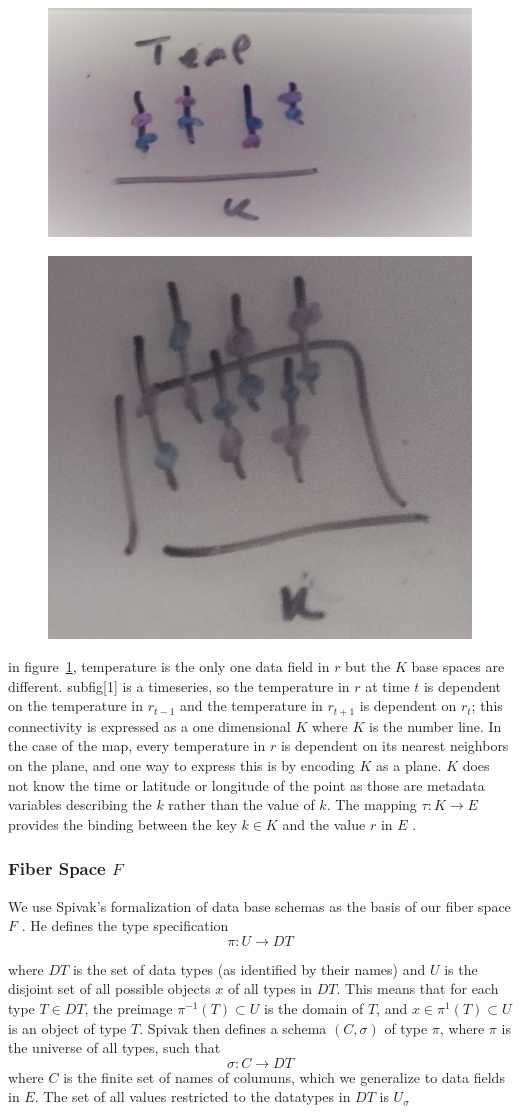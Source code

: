 \documentclass[../main.tex]{subfiles}
\begin{document}
\begin{figure}[ht]
    \includegraphics[width=0.2\linewidth]{figures/sections/math/temp_1k.png}
    \label{fig:k_data}
\end{figure}

\begin{figure}[ht]
    \includegraphics[width=0.2\linewidth]{figures/sections/math/temp_2k.png}
\end{figure}

in figure~\ref{fig:k_data}, temperature is the only one data field in $r$ but the $K$ base spaces are different. subfig[1] is a timeseries, so the temperature in $r$ at time $t$ is dependent on the temperature in $r_{t-1}$ and the temperature in $r_{t+1}$ is dependent on  $r_t$; this connectivity is expressed as a one dimensional $K$ where $K$ is the number line. In the case of the map, every temperature in $r$ is dependent on its nearest neighbors on the plane, and one way to express this is by encoding $K$ as a plane. $K$ does not know the time or latitude or longitude of the point as those are metadata variables describing the $k$ rather than the value of $k$. The mapping $\tau: K \rightarrow E$ provides the binding between the key $k \in K$ and the value $r$ in $E$ \cite{munznerChDataAbstraction}.

\subsubsection{Fiber Space $F$}
We use Spivak's formalization of data base schemas as the basis of our fiber space $F$ \cite{spivakSIMPLICIALDATABASES}. He defines the type specification 
\begin{equation}
\pi: U \rightarrow DT
\end{equation}

where $DT$ is the set of data types (as identified by their names) and $U$ is the disjoint set of all possible objects $x$ of all types in $DT$. This means that for each type $T\in DT$, the preimage $\pi^{-1}(T)\subset U $ is the domain of $T$, and $x \in \pi^{1}(T)\subset U$ is an object of type $T$. Spivak then defines a schema $(C, \sigma)$ of type $\pi$, where $\pi$ is the universe of all types, such that 
\begin{equation}
\sigma: C \rightarrow DT
\end{equation}
where $C$ is the finite set of names of columuns, which we generalize to data fields in $E$. The set of all values restricted to the datatypes in $DT$ is $U_{\sigma}$
\end{document}
